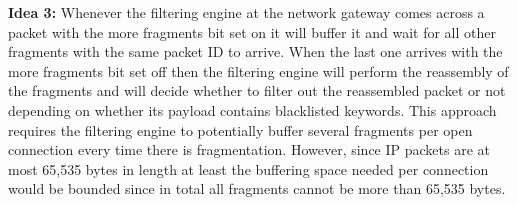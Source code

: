 \textbf{Idea 3: } Whenever the filtering engine at the network gateway comes across a packet with the more fragments bit set on it will buffer it and wait for all other fragments with the same packet ID to arrive. When the last one arrives with the more fragments bit set off then the filtering engine will perform the reassembly of the fragments and will decide whether to filter out the reassembled packet or not depending on whether its payload contains blacklisted keywords. This approach requires the filtering engine to potentially buffer several fragments per open connection every time there is fragmentation. However, since IP packets are at most 65,535 bytes in length at least the buffering space needed per connection would be bounded since in total all fragments cannot be more than 65,535 bytes.